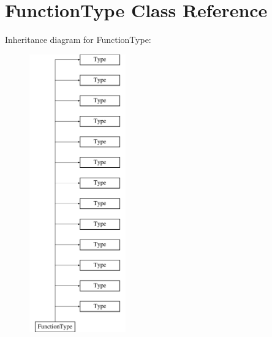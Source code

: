 \hypertarget{classFunctionType}{\section{Function\-Type Class Reference}
\label{classFunctionType}
}
Inheritance diagram for Function\-Type\-:\begin{figure}[H]
\begin{center}
\leavevmode
\includegraphics[height=12.000000cm]{classFunctionType}
\end{center}
\end{figure}
